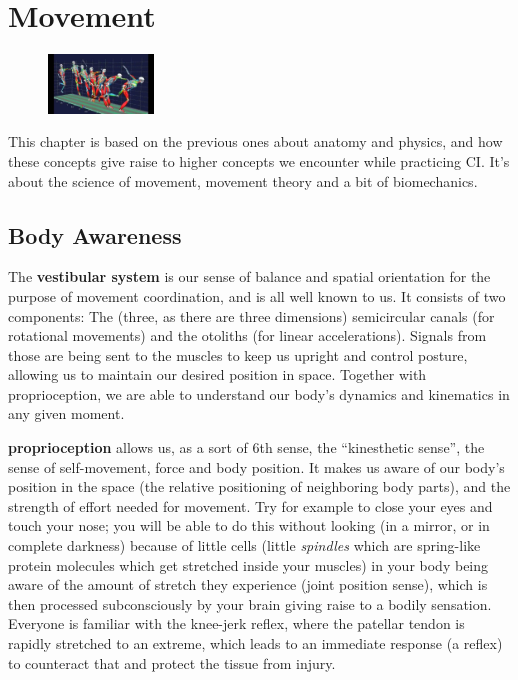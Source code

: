 \section{Movement}\label{sec:movement}

\begin{figure}
    \centering
    \includegraphics[width=0.25\textwidth]{images/movement}
\end{figure}

This chapter is based on the previous ones about anatomy and physics, and how these concepts give raise to higher concepts we encounter while practicing CI. It's about the science of movement, movement theory and a bit of biomechanics.

\subsection{Body Awareness}\label{subsec:body-awareness}

The \textbf{vestibular system} is our sense of balance and spatial orientation for the purpose of movement coordination, and is all well known to us.
It consists of two components: The (three, as there are three dimensions) semicircular canals (for rotational movements) and the otoliths (for linear accelerations).
Signals from those are being sent to the muscles to keep us upright and control posture, allowing us to maintain our desired position in space.
Together with proprioception, we are able to understand our body's dynamics and kinematics in any given moment.

\textbf{\Gls{proprioception}} allows us, as a sort of 6th sense, the ``kinesthetic sense'', the sense of self-movement, force and body position.
It makes us aware of our body's position in the space (the relative positioning of neighboring body parts), and the strength of effort needed for movement.
Try for example to close your eyes and touch your nose; you will be able to do this without looking (in a mirror, or in complete darkness) because of little cells (little \textit{spindles} which are spring-like protein molecules which get stretched inside your muscles) in your body being aware of the amount of stretch they experience (joint position sense), which is then processed subconsciously by your brain giving raise to a bodily sensation.
Everyone is familiar with the knee-jerk reflex, where the patellar tendon is rapidly stretched to an extreme, which leads to an immediate response (a reflex) to counteract that and protect the tissue from injury.

